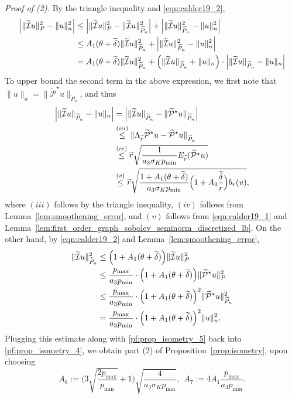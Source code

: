 \documentclass[twoside]{article}
\newcommand{\1}{\mathbf{1}}
\newcommand{\mc}[1]{\mathcal{#1}}
\newcommand{\wt}[1]{\widetilde{#1}}
\theoremstyle{definition}
\theoremstyle{remark}
\begin{document}
\textit{Proof of (2).}
By the triangle inequality and \eqref{eqn:calder19_2},
\begin{align}
\Bigl|\|\wt{\mc{I}}u\|_{P}^2 - \|u\|_{n}^2\Bigr| & \leq \Bigl|\|\wt{\mc{I}}u\|_{P}^2 - \|\wt{\mc{I}}u\|_{\wt{P}_n}^2\Bigr| + \Bigl|\|\wt{\mc{I}}u\|_{\wt{P}_n}^2 - \|u\|_{n}^2\Bigr| \nonumber \\
& \leq A_1(\theta + \wt{\delta}) \|\wt{\mc{I}}u\|_{\wt{P}_n}^2 + \Bigl|\|\wt{\mc{I}}u\|_{\wt{P}_n}^2 - \|u\|_{n}^2\Bigr| \nonumber\\
& = A_1(\theta + \wt{\delta}) \|\wt{\mc{I}}u\|_{\wt{P}_n}^2 + \Bigl(\|\wt{\mc{I}}u\|_{\wt{P}_n} + \|u\|_{n}\Bigr) \cdot \Bigl|\|\wt{\mc{I}}u\|_{\wt{P}_n} - \|u\|_{n}\Bigr| \label{pf:prop_isometry_4}
\end{align}
To upper bound the second term in the above expression, we first note that~$\|u\|_{n} = \|\wt{\mc{P}}^{\star}u\|_{\wt{P}_n}$, and thus
\begin{align}
\Bigl|\|\wt{\mc{I}}u\|_{\wt{P}_n} - \|u\|_{n} \Bigr| & = \Bigl|\|\wt{\mc{I}}u\|_{\wt{P}_n} - \|\wt{\mc{P}}^{\star}u\|_{\wt{P}_n}\Bigr| \nonumber \\
& \overset{(iii)}{\leq} \|\Lambda_{\wt{r}}\wt{\mc{P}}^{\star}u - \wt{\mc{P}}^{\star}u\|_{\wt{P}_n} \nonumber \\
& \overset{(iv)}{\leq} \wt{r} \sqrt{\frac{1}{a_3\sigma_K p_{\min}} E_{\wt{r}}(\wt{\mc{P}}^{\star}u)} \nonumber \\
& \overset{(v)}{\leq} \wt{r} \sqrt{\frac{1 + A_1(\theta + \wt{\delta})}{a_3\sigma_K p_{\min}} \Bigl(1 + A_3\frac{\wt{\delta}}{r}\Bigr) b_r(u)},\label{pf:prop_isometry_5}
\end{align}
where $(iii)$ follows by the triangle inequality, $(iv)$ follows from Lemma~\ref{lem:smoothening_error}, and $(v)$ follows from \eqref{eqn:calder19_1} and Lemma~\ref{lem:first_order_graph_sobolev_seminorm_discretized_lb}. On the other hand, by \eqref{eqn:calder19_2} and Lemma~\ref{lem:smoothening_error},
\begin{align*}
\|\wt{\mc{I}}u\|_{\wt{P}_n}^2 & \leq \Bigl(1 + A_1(\theta + \wt{\delta})\Bigr) \|\wt{\mc{I}}u\|_{P}^2 \\
& \leq \frac{p_{\max}}{a_3p_{\min}} \cdot \Bigl(1 + A_1(\theta + \wt{\delta})\Bigr) \|\wt{\mc{P}}^{\star}u\|_{P}^2 \\
& \leq \frac{p_{\max}}{a_3p_{\min}} \cdot \Bigl(1 + A_1(\theta + \wt{\delta})\Bigr)^2 \|\wt{\mc{P}}^{\star}u\|_{\wt{P}_n}^2 \\
& = \frac{p_{\max}}{a_3p_{\min}} \cdot \Bigl(1 + A_1(\theta + \wt{\delta})\Bigr)^2 \|u\|_{n}^2.
\end{align*}
Plugging this estimate along with \eqref{pf:prop_isometry_5} back into \eqref{pf:prop_isometry_4}, we obtain part (2) of Proposition~\ref{prop:isometry}, upon choosing
\begin{equation*}
A_6 := \biggl(3\sqrt{\frac{2p_{\max}}{p_{\min}}} + 1\biggr)\sqrt{\frac{4}{a_3\sigma_Kp_{\min}}},~~A_7:=4A_1\frac{p_{\max}}{a_3p_{\min}}.
\end{equation*}
\end{document}
